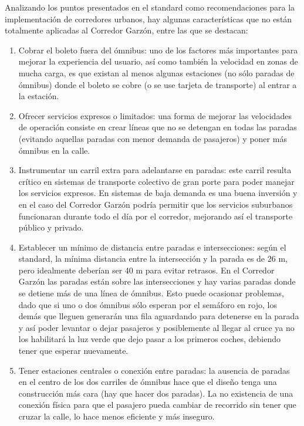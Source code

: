 \newpage
Analizando los puntos presentados en el standard como recomendaciones para la implementación de corredores urbanos, hay algunas características que no están totalmente aplicadas al Corredor Garzón, entre las que se destacan:

\begin{enumerate}
	\item Cobrar el boleto fuera del ómnibus: uno de los factores más importantes para mejorar la experiencia del usuario, así como también la velocidad en zonas de mucha carga, es que existan al menos algunas estaciones (no sólo paradas de ómnibus) donde el boleto se cobre (o se use tarjeta de transporte) al entrar a la estación.
	\item Ofrecer servicios expresos o limitados: una forma de mejorar las velocidades de operación consiste en crear líneas que no se detengan en todas las paradas (evitando aquellas paradas con menor demanda de pasajeros) y poner más ómnibus en la calle.
	\item Instrumentar un carril extra para adelantarse en paradas: este carril resulta crítico en sistemas de transporte colectivo de gran porte para poder manejar los servicios expresos. En sistemas de baja demanda es una buena inversión y en el caso del Corredor Garzón podría permitir que los servicios suburbanos funcionaran durante todo el día por el corredor, mejorando así el transporte público y privado.
	\item Establecer un mínimo de distancia entre paradas e intersecciones: según el standard, la mínima distancia entre la intersección y la parada es de 26 m, pero idealmente deberían ser 40 m para evitar retrasos. En el Corredor Garzón las paradas están sobre las intersecciones y hay varias paradas donde se detiene más de una línea de ómnibus. Esto puede ocasionar problemas, dado que si uno o dos ómnibus sólo esperan por el semáforo en rojo, los demás que lleguen generarán una fila aguardando para detenerse en la parada y así poder levantar o dejar pasajeros y posiblemente al llegar al cruce ya no los habilitará la luz verde que dejo pasar a los primeros coches, debiendo tener que esperar nuevamente.
	\item Tener estaciones centrales o conexión entre paradas: la ausencia de paradas en el centro de los dos carriles de ómnibus hace que el diseño tenga una construcción más cara (hay que hacer dos paradas). La no existencia de una conexión física para que el pasajero pueda cambiar de recorrido sin tener que cruzar la calle, lo hace menos eficiente y más inseguro.

\end{enumerate}
